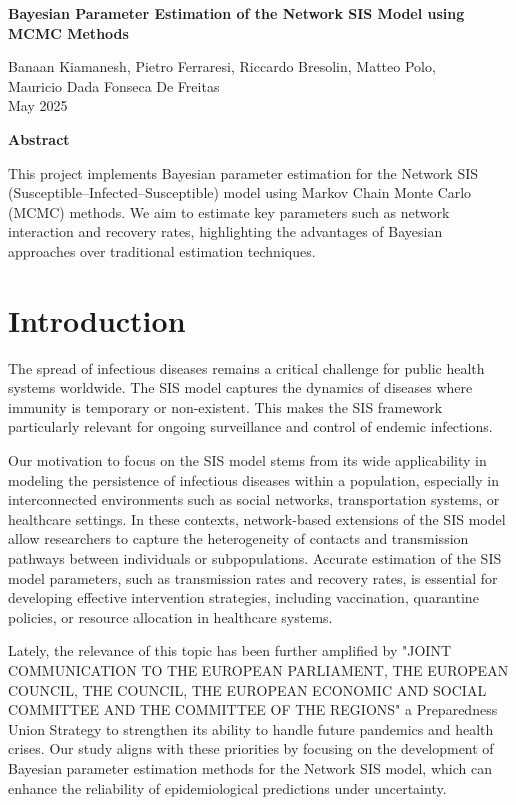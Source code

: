 \documentclass[a4paper,10pt]{report}
\begin{document}
\begin{center}
	{\LARGE\bfseries Bayesian Parameter Estimation of the Network SIS Model using MCMC Methods \par}
	\vspace{0.6cm}
	Banaan Kiamanesh, Pietro Ferraresi, Riccardo Bresolin, Matteo Polo,\\ Mauricio Dada Fonseca De Freitas \\
	May 2025
\end{center}

\vspace{0cm}

\begin{center}
	\textbf{Abstract}
\end{center}
This project implements Bayesian parameter estimation for the Network SIS (Susceptible–Infected–Susceptible) model using Markov Chain Monte Carlo (MCMC) methods. We aim to estimate key parameters such as network interaction and recovery rates, highlighting the advantages of Bayesian approaches over traditional estimation techniques.


\section{Introduction}

The spread of infectious diseases remains a critical challenge for public health systems worldwide. The SIS model captures the dynamics of diseases where immunity is temporary or non-existent. This makes the SIS framework particularly relevant for ongoing surveillance and control of endemic infections.

Our motivation to focus on the SIS model stems from its wide applicability in modeling the persistence of infectious diseases within a population, especially in interconnected environments such as social networks, transportation systems, or healthcare settings. In these contexts, network-based extensions of the SIS model allow researchers to capture the heterogeneity of contacts and transmission pathways between individuals or subpopulations. Accurate estimation of the SIS model parameters, such as transmission rates and recovery rates, is essential for developing effective intervention strategies, including vaccination, quarantine policies, or resource allocation in healthcare systems.

Lately, the relevance of this topic has been further amplified by "JOINT COMMUNICATION TO THE EUROPEAN PARLIAMENT, THE 
EUROPEAN COUNCIL, THE COUNCIL, THE EUROPEAN ECONOMIC AND 
SOCIAL COMMITTEE AND THE COMMITTEE OF THE REGIONS" a Preparedness Union Strategy to strengthen its ability to handle future pandemics and health crises. Our study aligns with these priorities by focusing on the development of Bayesian parameter estimation methods for the Network SIS model, which can enhance the reliability of epidemiological predictions under uncertainty.
\end{document}
